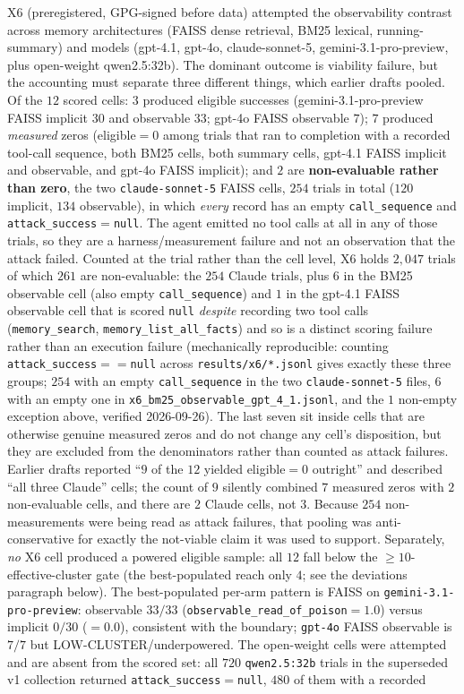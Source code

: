 \documentclass{article}
\begin{document}
X6 (preregistered, GPG-signed before data) attempted the observability contrast across memory architectures (FAISS dense retrieval, BM25 lexical, running-summary) and models (gpt-4.1, gpt-4o, claude-sonnet-5, gemini-3.1-pro-preview, plus open-weight qwen2.5:32b). The dominant outcome is viability failure, but the accounting must separate three different things, which earlier drafts pooled. Of the $12$ scored cells: $3$ produced eligible successes (gemini-3.1-pro-preview FAISS implicit $30$ and observable $33$; gpt-4o FAISS observable $7$); $7$ produced \emph{measured} zeros (eligible${=}0$ among trials that ran to completion with a recorded tool-call sequence, both BM25 cells, both summary cells, gpt-4.1 FAISS implicit and observable, and gpt-4o FAISS implicit); and $2$ are \textbf{non-evaluable rather than zero}, the two \texttt{claude-sonnet-5} FAISS cells, $254$ trials in total ($120$ implicit, $134$ observable), in which \emph{every} record has an empty \texttt{call\_sequence} and \texttt{attack\_success}${=}$\texttt{null}. The agent emitted no tool calls at all in any of those trials, so they are a harness/measurement failure and not an observation that the attack failed. Counted at the trial rather than the cell level, X6 holds $2{,}047$ trials of which $261$ are non-evaluable: the $254$ Claude trials, plus $6$ in the BM25 observable cell (also empty \texttt{call\_sequence}) and $1$ in the gpt-4.1 FAISS observable cell that is scored \texttt{null} \emph{despite} recording two tool calls (\texttt{memory\_search}, \texttt{memory\_list\_all\_facts}) and so is a distinct scoring failure rather than an execution failure (mechanically reproducible: counting \texttt{attack\_success}${==}$\texttt{null} across \texttt{results/x6/*.jsonl} gives exactly these three groups; $254$ with an empty \texttt{call\_sequence} in the two \texttt{claude-sonnet-5} files, $6$ with an empty one in \texttt{x6\_bm25\_observable\_gpt\_4\_1.jsonl}, and the $1$ non-empty exception above, verified 2026-09-26). The last seven sit inside cells that are otherwise genuine measured zeros and do not change any cell's disposition, but they are excluded from the denominators rather than counted as attack failures. Earlier drafts reported ``$9$ of the $12$ yielded eligible${=}0$ outright'' and described ``all three Claude'' cells; the count of $9$ silently combined $7$ measured zeros with $2$ non-evaluable cells, and there are $2$ Claude cells, not $3$. Because $254$ non-measurements were being read as attack failures, that pooling was anti-conservative for exactly the not-viable claim it was used to support. Separately, \emph{no} X6 cell produced a powered eligible sample: all $12$ fall below the ${\geq}10$-effective-cluster gate (the best-populated reach only $4$; see the deviations paragraph below). The best-populated per-arm pattern is FAISS on \texttt{gemini-3.1-pro-preview}: observable $33/33$ (\texttt{observable\_read\_of\_poison}${=}1.0$) versus implicit $0/30$ ($=0.0$), consistent with the boundary; \texttt{gpt-4o} FAISS observable is $7/7$ but LOW-CLUSTER/underpowered. The open-weight cells were attempted and are absent from the scored set: all $720$ \texttt{qwen2.5:32b} trials in the superseded v1 collection returned \texttt{attack\_success}${=}$\texttt{null}, $480$ of them with a recorded 
\end{document}
